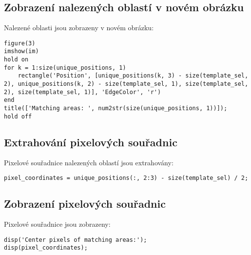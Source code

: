 \subsection*{Zobrazení nalezených oblastí v novém obrázku}
Nalezené oblasti jsou zobrazeny v novém obrázku:
\begin{verbatim}
figure(3)
imshow(im)
hold on
for k = 1:size(unique_positions, 1)
    rectangle('Position', [unique_positions(k, 3) - size(template_sel, 2), unique_positions(k, 2) - size(template_sel, 1), size(template_sel, 2), size(template_sel, 1)], 'EdgeColor', 'r')
end
title(['Matching areas: ', num2str(size(unique_positions, 1))]);
hold off
\end{verbatim}

\subsection*{Extrahování pixelových souřadnic}
Pixelové souřadnice nalezených oblastí jsou extrahovány:
\begin{verbatim}
pixel_coordinates = unique_positions(:, 2:3) - size(template_sel) / 2;
\end{verbatim}

\subsection*{Zobrazení pixelových souřadnic}
Pixelové souřadnice jsou zobrazeny:
\begin{verbatim}
disp('Center pixels of matching areas:');
disp(pixel_coordinates);
\end{verbatim}
